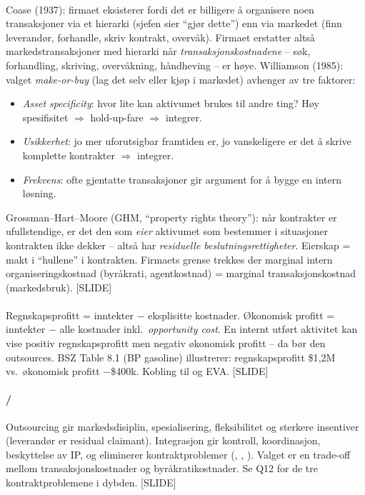 \paragraph{\quad\SOne}
Coase (1937): firmaet eksisterer fordi det er billigere å organisere noen transaksjoner via et hierarki (sjefen sier ``gjør dette'') enn via markedet (finn leverandør, forhandle, skriv kontrakt, overvåk). Firmaet erstatter altså markedstransaksjoner med hierarki når \emph{transaksjonskostnadene} -- søk, forhandling, skriving, overvåkning, håndheving -- er høye. Williamson (1985): valget \emph{make-or-buy} (lag det selv eller kjøp i markedet) avhenger av tre faktorer:
\begin{itemize}\setlength{\itemsep}{1pt}
\item \emph{Asset specificity}: hvor lite kan aktivumet brukes til andre ting? Høy spesifisitet $\Rightarrow$ hold-up-fare $\Rightarrow$ integrer.
\item \emph{Usikkerhet}: jo mer uforutsigbar framtiden er, jo vanskeligere er det å skrive komplette kontrakter $\Rightarrow$ integrer.
\item \emph{Frekvens}: ofte gjentatte transaksjoner gir argument for å bygge en intern løsning.
\end{itemize}
Grossman--Hart--Moore (GHM, ``property rights theory''): når kontrakter er ufullstendige, er det den som \emph{eier} aktivumet som bestemmer i situasjoner kontrakten ikke dekker -- altså har \emph{residuelle beslutningsrettigheter}. Eierskap = makt i ``hullene'' i kontrakten. Firmaets grense trekkes der marginal intern organiseringskostnad (byråkrati, agentkostnad) = marginal transaksjonskostnad (markedsbruk). [SLIDE]

\paragraph{\quad\STwo}
Regnskapsprofitt = inntekter $-$ eksplisitte kostnader. Økonomisk profitt = inntekter $-$ alle kostnader inkl.\ \emph{opportunity cost}. En internt utført aktivitet kan vise positiv regnskapsprofitt men negativ økonomisk profitt -- da bør den outsources. BSZ Table 8.1 (BP gasoline) illustrerer: regnskapsprofitt \$1{,}2M vs.\ økonomisk profitt $-$\$400k. Kobling til  og EVA. [SLIDE]

\paragraph{\quad\SOne/\SThree}
Outsourcing gir markedsdisiplin, spesialisering, fleksibilitet og sterkere insentiver (leverandør er residual claimant). Integrasjon gir kontroll, koordinasjon, beskyttelse av IP, og eliminerer kontraktproblemer (, , ). Valget er en trade-off mellom transaksjonskostnader og byråkratikostnader. Se Q12 for de tre kontraktproblemene i dybden. [SLIDE]

